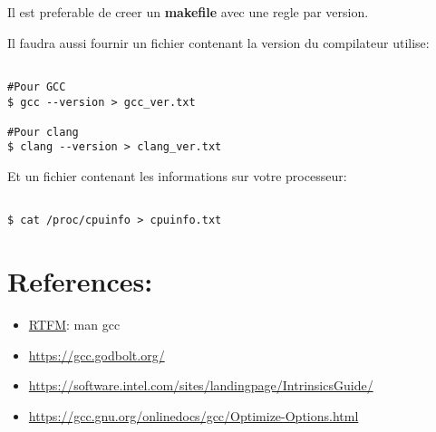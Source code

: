 \documentclass[11pt]{article}
\begin{document}
Il est preferable de creer un \textbf{makefile} avec une regle par version.

Il faudra aussi fournir un fichier contenant la version du compilateur utilise:

\begin{verbatim}

#Pour GCC
$ gcc --version > gcc_ver.txt

#Pour clang
$ clang --version > clang_ver.txt

\end{verbatim}

Et un fichier contenant les informations sur votre processeur:

\begin{verbatim}

$ cat /proc/cpuinfo > cpuinfo.txt

\end{verbatim}

\section{References:}
\label{sec:org42d1b5f}

\begin{itemize}
\item \uline{RTFM}: man gcc

\item \url{https://gcc.godbolt.org/}
\item \url{https://software.intel.com/sites/landingpage/IntrinsicsGuide/}
\item \url{https://gcc.gnu.org/onlinedocs/gcc/Optimize-Options.html}
\end{itemize}
\end{document}
